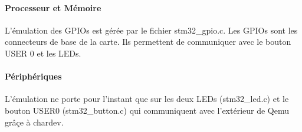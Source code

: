 \documentclass{article}
\begin{document}
			\paragraph{Processeur et Mémoire \\}
			L'émulation des GPIOs est gérée par le fichier stm32\_gpio.c. Les GPIOs sont les connecteurs de
			base de la carte. Ils permettent de communiquer avec le bouton USER 0 et les LEDs.
			
			\paragraph{Périphériques \\}
			L'émulation ne porte pour l'instant que sur les deux LEDs (stm32\_led.c) et le bouton USER0 (stm32\_button.c) 
			qui communiquent avec l'extérieur de Qemu grâçe à chardev.
			
\end{document}
